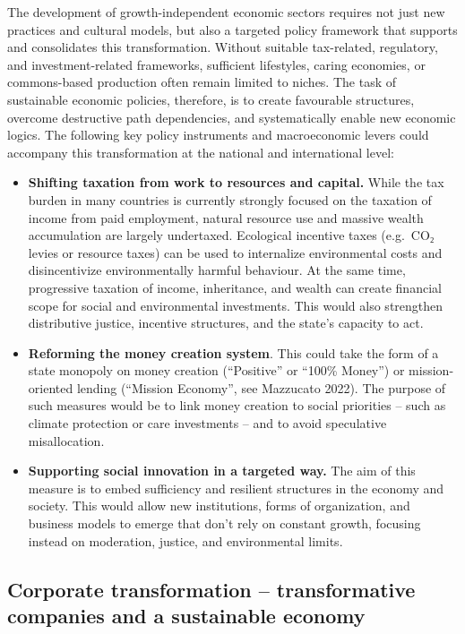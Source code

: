 \documentclass[
  a4paper,
  DIV=11,
  numbers=noendperiod,
  oneside,
  openany]{scrreprt}
\begin{document}
The development of growth-independent economic sectors requires not just
new practices and cultural models, but also a targeted policy framework
that supports and consolidates this transformation. Without suitable
tax-related, regulatory, and investment-related frameworks, sufficient
lifestyles, caring economies, or commons-based production often remain
limited to niches. The task of sustainable economic policies, therefore,
is to create favourable structures, overcome destructive path
dependencies, and systematically enable new economic logics. The
following key policy instruments and macroeconomic levers could
accompany this transformation at the national and international level:

\begin{itemize}
\item
  \textbf{Shifting taxation from work to resources and capital.} While
  the tax burden in many countries is currently strongly focused on the
  taxation of income from paid employment, natural resource use and
  massive wealth accumulation are largely undertaxed. Ecological
  incentive taxes (e.g.~CO₂ levies or resource taxes) can be used to
  internalize environmental costs and disincentivize environmentally
  harmful behaviour. At the same time, progressive taxation of income,
  inheritance, and wealth can create financial scope for social and
  environmental investments. This would also strengthen distributive
  justice, incentive structures, and the state's capacity to act.
\item
  \textbf{Reforming the money creation system}. This could take the form
  of a state monopoly on money creation (``Positive'' or ``100\%
  Money'') or mission-oriented lending (``Mission Economy'', see
  Mazzucato 2022). The purpose of such measures would be to link money
  creation to social priorities -- such as climate protection or care
  investments -- and to avoid speculative misallocation.
\item
  \textbf{Supporting social innovation in a targeted way.} The aim of
  this measure is to embed sufficiency and resilient structures in the
  economy and society. This would allow new institutions, forms of
  organization, and business models to emerge that don't rely on
  constant growth, focusing instead on moderation, justice, and
  environmental limits.
\end{itemize}

\subsection{Corporate transformation -- transformative companies and a
sustainable
economy}\label{corporate-transformation-transformative-companies-and-a-sustainable-economy}
\end{document}
